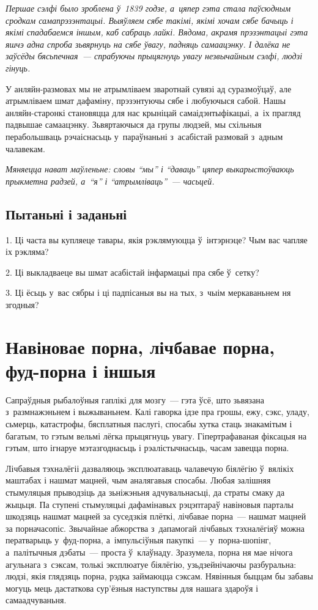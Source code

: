 \emph{Першае сэлфі было зроблена ў~1839 годзе, а~цяпер гэта стала паўсюдным сродкам самапрэзэнтацыі. Выяўляем сябе такімі, якімі хочам сябе бачыць і якімі спадабаемся іншым, каб сабраць лайкі. Вядома, акрамя прэзэнтацыі гэта яшчэ адна спроба зьвярнуць на сябе ўвагу, падняць самаацэнку. І далёка не заўсёды бясьпечная~--- спрабуючы прыцягнуць увагу незвычайным сэлфі, людзі гінуць.} 


У анляйн-размовах мы не атрымліваем зваротнай сувязі ад суразмоўцаў, але атрымліваем шмат дафаміну, прэзэнтуючы сябе і любуючыся сабой. Нашы анляйн-старонкі становяцца для нас крыніцай самаідэнтыфікацыі, а~іх прагляд падвышае самаацэнку. Зьвяртаючыся да групы людзей, мы схільныя перабольшваць рэчаіснасьць у~параўнаньні з~асабістай размовай з~адным чалавекам.

\emph{Мяняецца нават маўленьне: словы ``мы'' і ``даваць'' цяпер выкарыстоўваюць прыкметна радзей, а~``я'' і ``атрымліваць''~--- часьцей.}

\subsection*{Пытаньні і заданьні}

1. Ці часта вы купляеце тавары, якія рэклямуюцца ў~інтэрнэце? Чым вас чапляе іх рэкляма?

2. Ці выкладваеце вы шмат асабістай інфармацыі пра сябе ў~сетку?

3. Ці ёсьць у~вас сябры і ці падпісаныя вы на тых, з~чыім меркаваньнем ня згодныя?


\section{Навіновае порна, лічбавае порна, фуд-порна і іншыя}

Сапраўдныя рыбалоўныя гаплікі для мозгу~--- гэта ўсё, што зьвязана з~размнажэньнем і выжываньнем. Калі гаворка ідзе пра грошы, ежу, сэкс, уладу, сьмерць, катастрофы, бясплатныя паслугі, спосабы хутка стаць знакамітым і багатым, то гэтым вельмі лёгка прыцягнуць увагу. Гіпертрафаваная фіксацыя на гэтым, што ігнаруе мэтазгоднасьць і рэалістычнасьць, часам завецца порна.

Лічбавыя тэхналёгіі дазваляюць эксплюатаваць чалавечую біялёгію ў~вялікіх маштабах і нашмат мацней, чым аналягавыя спосабы. Любая залішняя стымуляцыя прыводзіць да зьніжэньня адчувальнасьці, да страты смаку да жыцьця. Па ступені стымуляцыі дафамінавых рэцэптараў навіновыя парталы шкодзяць нашмат мацней за суседзкія плёткі, лічбавае порна~--- нашмат мацней за порначасопіс. Звычайнае абжорства з~дапамогай лічбавых тэхналёгіяў можна ператварыць у~фуд-порна, а~імпульсіўныя пакупкі~--- у~порна-шопінг, а~палітычныя дэбаты~--- проста ў~клаўнаду. Зразумела, порна ня мае нічога агульнага з~сэксам, толькі эксплюатуе біялёгію, узьдзейнічаючы разбуральна: людзі, якія глядзяць порна, рэдка займаюцца сэксам. Нявінныя быццам бы забавы могуць мець дастаткова сур'ёзныя наступствы для нашага здароўя і самаадчуваньня.

